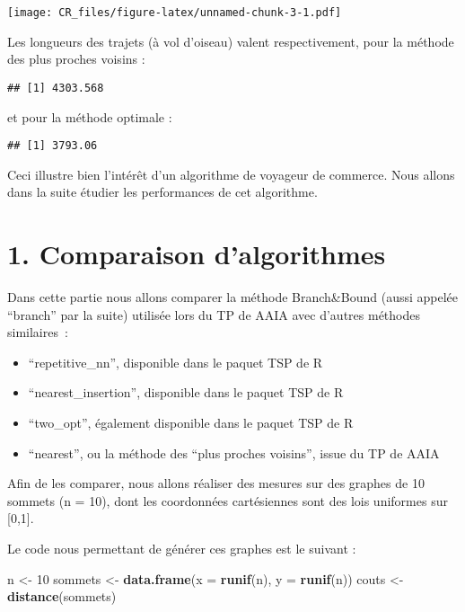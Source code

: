 \documentclass[
]{article}
\newenvironment{Shaded}{\begin{snugshade}}{\end{snugshade}}
\newcommand{\DataTypeTok}[1]{\textcolor[rgb]{0.13,0.29,0.53}{#1}}
\newcommand{\DecValTok}[1]{\textcolor[rgb]{0.00,0.00,0.81}{#1}}
\newcommand{\KeywordTok}[1]{\textcolor[rgb]{0.13,0.29,0.53}{\textbf{#1}}}
\newcommand{\NormalTok}[1]{#1}
\newcommand{\StringTok}[1]{\textcolor[rgb]{0.31,0.60,0.02}{#1}}
\providecommand{\tightlist}{%
  \setlength{\itemsep}{0pt}\setlength{\parskip}{0pt}}
\begin{document}
\texttt{[image: CR\_files/figure-latex/unnamed-chunk-3-1.pdf]}

Les longueurs des trajets (à vol d'oiseau) valent respectivement, pour
la méthode des plus proches voisins :

\begin{verbatim}
## [1] 4303.568
\end{verbatim}

et pour la méthode optimale :

\begin{verbatim}
## [1] 3793.06
\end{verbatim}

Ceci illustre bien l'intérêt d'un algorithme de voyageur de commerce.
Nous allons dans la suite étudier les performances de cet algorithme.

\hypertarget{comparaison-dalgorithmes}{%
\section{1. Comparaison d'algorithmes}\label{comparaison-dalgorithmes}}

Dans cette partie nous allons comparer la méthode Branch\&Bound (aussi
appelée ``branch'' par la suite) utilisée lors du TP de AAIA avec
d'autres méthodes similaires~:

\begin{itemize}
\tightlist
\item
  ``repetitive\_nn'', disponible dans le paquet TSP de R
\item
  ``nearest\_insertion'', disponible dans le paquet TSP de R
\item
  ``two\_opt'', également disponible dans le paquet TSP de R
\item
  ``nearest'', ou la méthode des ``plus proches voisins'', issue du TP
  de AAIA
\end{itemize}

Afin de les comparer, nous allons réaliser des mesures sur des graphes
de 10 sommets (n = 10), dont les coordonnées cartésiennes sont des lois
uniformes sur {[}0,1{]}.

Le code nous permettant de générer ces graphes est le suivant :

\begin{Shaded}
\begin{Highlighting}[]
\NormalTok{      n <-}\StringTok{ }\DecValTok{10}
\NormalTok{sommets <-}\StringTok{ }\KeywordTok{data.frame}\NormalTok{(}\DataTypeTok{x =} \KeywordTok{runif}\NormalTok{(n), }\DataTypeTok{y =} \KeywordTok{runif}\NormalTok{(n))}
\NormalTok{  couts <-}\StringTok{ }\KeywordTok{distance}\NormalTok{(sommets)}
\end{Highlighting}
\end{Shaded}
\end{document}
